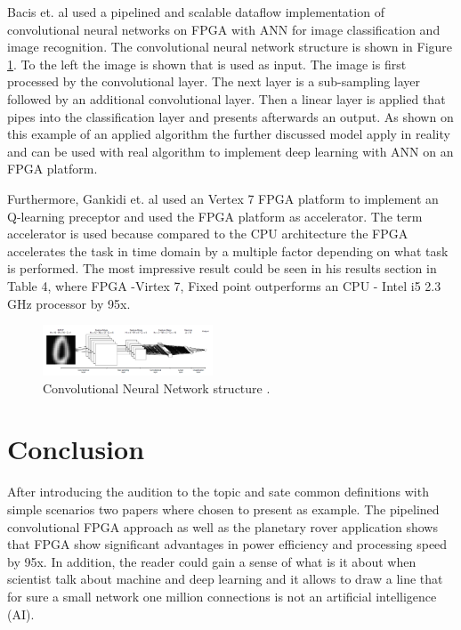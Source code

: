 \documentclass[conference]{IEEEtran}
\begin{document}
Bacis et. al \cite{Bacis} used a pipelined and scalable dataflow implementation of convolutional neural networks on FPGA with ANN for image classification and image recognition. The convolutional neural network structure is shown in Figure \ref{fig: Convolutional_Neural_Network_structure}. To the left the image is shown that is used as input. The image is first processed by the convolutional layer. The next layer is a sub-sampling layer followed by an additional convolutional layer. Then a linear layer is applied that pipes into the classification layer and presents afterwards an output. 
As shown on this example of an applied algorithm the further discussed model apply in reality and can be used with real algorithm to implement deep learning with ANN on an FPGA platform.

Furthermore, Gankidi et. al \cite{Gankidi} used an Vertex 7 FPGA platform to implement an Q-learning preceptor and used the FPGA platform as accelerator. The term accelerator is used because compared to the CPU architecture the FPGA accelerates the task in time domain by a multiple factor depending on what task is performed. The most impressive result could be seen in his results section in Table 4, where FPGA -Virtex 7, Fixed point outperforms an CPU - Intel i5 2.3 GHz processor by 95x.   

\begin{figure}[htbp]
	\centerline{\includegraphics[width=0.45\textwidth]{01_images/Convolutional_Neural_Network_structure.PNG}}
	\caption{Convolutional Neural Network structure \cite{Bacis}.}
	\label{fig: Convolutional_Neural_Network_structure}
\end{figure}


\section{Conclusion}\label{Conclusion}
After introducing the audition to the topic and sate common definitions with simple scenarios two papers where chosen to present as example. The pipelined convolutional FPGA approach as well as the planetary rover application shows that FPGA show significant advantages in power efficiency and processing speed by 95x. 
In addition, the reader could gain a sense of what is it about when scientist talk about machine and deep learning and it allows to draw a line that for sure a small network one million connections is not an artificial intelligence (AI).
\end{document}
